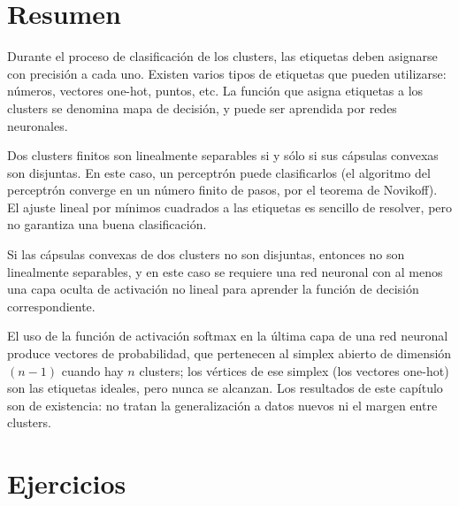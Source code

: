 \documentclass[12pt, a4paper]{amsbook}
\newcommand{\R}{{\mathbb R}}
\newcommand{\G}{{\mathcal G}}
\theoremstyle{remark}
\theoremstyle{definition}
\numberwithin{section}{chapter}
\numberwithin{subsection}{section}
\numberwithin{equation}{section}
\numberwithin{figure}{chapter}
\begin{document}
%
%
%

\section{Resumen}\label{sec.c10.9}
Durante el proceso de clasificación de los clusters, las etiquetas deben asignarse con precisión a cada uno. Existen varios tipos de etiquetas que pueden utilizarse: números, vectores one-hot, puntos, etc. La función que asigna etiquetas a los clusters se denomina mapa de decisión, y puede ser aprendida por redes neuronales.

Dos clusters finitos son linealmente separables si y sólo si sus cápsulas convexas son disjuntas. En este caso, un perceptrón puede clasificarlos (el algoritmo del perceptrón converge en un número finito de pasos, por el teorema de Novikoff). El ajuste lineal por mínimos cuadrados a las etiquetas es sencillo de resolver, pero no garantiza una buena clasificación.

Si las cápsulas convexas de dos clusters no son disjuntas, entonces no son linealmente separables, y en este caso se requiere una red neuronal con al menos una capa oculta de activación no lineal para aprender la función de decisión correspondiente.

El uso de la función de activación softmax en la última capa de una red neuronal produce vectores de probabilidad, que pertenecen al simplex abierto de dimensión $(n-1)$ cuando hay $n$ clusters; los vértices de ese simplex (los vectores one-hot) son las etiquetas ideales, pero nunca se alcanzan. Los resultados de este capítulo son de existencia: no tratan la generalización a datos nuevos ni el margen entre clusters.

\section{Ejercicios}\label{sec.c10.10}
\end{document}

